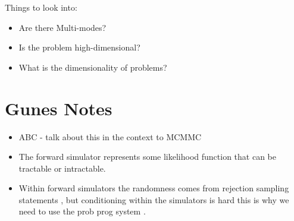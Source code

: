 \documentclass[]{scrartcl}
\begin{document}
Things to look into:

\begin{itemize}
\item Are there Multi-modes?
\item Is the problem high-dimensional?
\item What is the dimensionality of problems?
\end{itemize}

\section{Gunes Notes}
\begin{itemize}
	\item ABC - talk about this in the context to MCMMC
	\item The forward simulator represents some likelihood function that can be tractable or intractable. 
	\item Within forward simulators the randomness comes from rejection sampling statements , but conditioning within the simulators is hard
this is why we need to use the prob prog system . 
\end{itemize}
\end{document}
